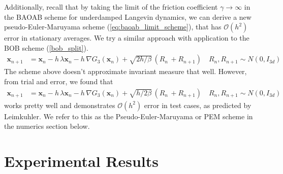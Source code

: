 \documentclass[11pt, twoside]{report}
\renewcommand{\vec}[1]{{\mathbf{#1}}}
\begin{document}
Additionally, recall that by taking the limit of the friction coefficient $\gamma \to \infty$ in the BAOAB scheme for underdamped Langevin dynamics, we can derive a new pseudo-Euler-Maruyama scheme (\ref{eq:baoab_limit_scheme}), that has $\mathcal{O}(h^2)$ error in stationary averages\cite{leimkuhler2013rational}. We try a similar approach with application to the BOB scheme (\ref{bob_split}).
\begin{equation} 
\begin{split} 
\vec x_{n+1}&=\vec x_{n} - h \,\lambda \vec x_{n} - h\,\nabla G_{3}(\vec x_n) +\sqrt{2h/\beta} \, (R_n\, + R_{n+1}) \quad R_n, R_{n+1} \sim N(0,I_{3d})
\label{pseudo-euler}
\end{split}
\end{equation}
The scheme above doesn't approximate invariant measure that well. However, from trial and error, we found that
\begin{equation}
\begin{aligned}
\vec x_{n+1}&=\vec x_{n} - h \,\lambda \vec x_{n} - h\,\nabla G_{3}(\vec x_n) +\sqrt{h/2\beta} \, (R_n\, + R_{n+1}) \quad R_n, R_{n+1} \sim N(0,I_{3d})
\end{aligned}
\end{equation}
works pretty well and demonstrates $\mathcal{O}(h^2)$ error in test cases, as predicted by Leimkuhler. We refer to this as the Pseudo-Euler-Maruyama or PEM scheme in the numerics section below.

\chapter{Experimental Results}
\end{document}
